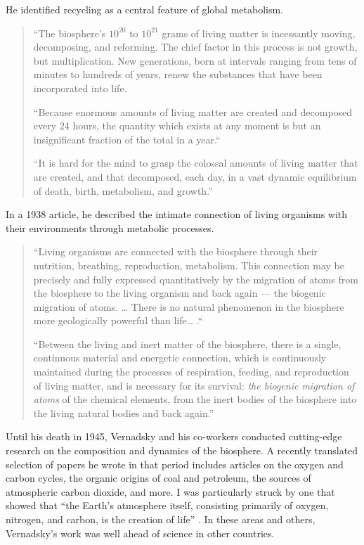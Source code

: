 \documentclass[11pt,a4paper]{article}
\begin{document}
He identified recycling as a central feature of global metabolism.
\begin{quote}
  “The biosphere’s $10^{20}$ to $10^{21}$ grams of living matter is
  incessantly moving, decomposing, and reforming. The chief factor in this
  process is not growth, but multiplication. New generations, born at
  intervals ranging from tens of minutes to hundreds of years, renew the
  substances that have been incorporated into life.

  “Because enormous amounts of living matter are created and decomposed every
  24 hours, the quantity which exists at any moment is but an insignificant
  fraction of the total in a year.“

  “It is hard for the mind to grasp the colossal amounts of living matter that
  are created, and that decomposed, each day, in a vast dynamic equilibrium of
  death, birth, metabolism, and growth.” \cite[p. 72]{6}
\end{quote}
In a 1938 article, he described the intimate connection of living organisms
with their environments through metabolic processes.
\begin{quote}
  “Living organisms are connected with the biosphere through their nutrition,
  breathing, reproduction, metabolism. This connection may be precisely and
  fully expressed quantitatively by the migration of atoms from the biosphere
  to the living organism and back again — the biogenic migration of atoms. …
  There is no natural phenomenon in the biosphere more geologically powerful
  than life… .“

  “Between the living and inert matter of the biosphere, there is a single,
  continuous material and energetic connection, which is continuously
  maintained during the processes of respiration, feeding, and reproduction of
  living matter, and is necessary for its survival: \emph{the biogenic
    migration of atoms} of the chemical elements, from the inert bodies of the
  biosphere into the living natural bodies and back again.” \cite[p. 39,
    50]{10}
\end{quote}
Until his death in 1945, Vernadsky and his co-workers conducted cutting-edge
research on the composition and dynamics of the biosphere. A recently
translated selection of papers he wrote in that period includes articles on
the oxygen and carbon cycles, the organic origins of coal and petroleum, the
sources of atmospheric carbon dioxide, and more. I was particularly struck by
one that showed that “the Earth’s atmosphere itself, consisting primarily of
oxygen, nitrogen, and carbon, is the creation of life” \cite{11}. In these
areas and others, Vernadsky’s work was well ahead of science in other
countries.
\end{document}
